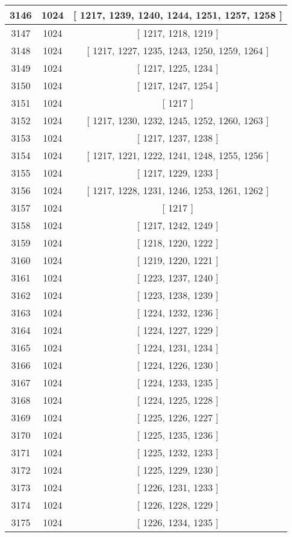 \begin{center}
\begin{longtable}[H]{|| c c c ||}
\hline
3146 & 1024 & [ 1217, 1239, 1240, 1244, 1251, 1257, 1258 ] \\ 
\hline
3147 & 1024 & [ 1217, 1218, 1219 ] \\ 
\hline
3148 & 1024 & [ 1217, 1227, 1235, 1243, 1250, 1259, 1264 ] \\ 
\hline
3149 & 1024 & [ 1217, 1225, 1234 ] \\ 
\hline
3150 & 1024 & [ 1217, 1247, 1254 ] \\ 
\hline
3151 & 1024 & [ 1217 ] \\ 
\hline
3152 & 1024 & [ 1217, 1230, 1232, 1245, 1252, 1260, 1263 ] \\ 
\hline
3153 & 1024 & [ 1217, 1237, 1238 ] \\ 
\hline
3154 & 1024 & [ 1217, 1221, 1222, 1241, 1248, 1255, 1256 ] \\ 
\hline
3155 & 1024 & [ 1217, 1229, 1233 ] \\ 
\hline
3156 & 1024 & [ 1217, 1228, 1231, 1246, 1253, 1261, 1262 ] \\ 
\hline
3157 & 1024 & [ 1217 ] \\ 
\hline
3158 & 1024 & [ 1217, 1242, 1249 ] \\ 
\hline
3159 & 1024 & [ 1218, 1220, 1222 ] \\ 
\hline
3160 & 1024 & [ 1219, 1220, 1221 ] \\ 
\hline
3161 & 1024 & [ 1223, 1237, 1240 ] \\ 
\hline
3162 & 1024 & [ 1223, 1238, 1239 ] \\ 
\hline
3163 & 1024 & [ 1224, 1232, 1236 ] \\ 
\hline
3164 & 1024 & [ 1224, 1227, 1229 ] \\ 
\hline
3165 & 1024 & [ 1224, 1231, 1234 ] \\ 
\hline
3166 & 1024 & [ 1224, 1226, 1230 ] \\ 
\hline
3167 & 1024 & [ 1224, 1233, 1235 ] \\ 
\hline
3168 & 1024 & [ 1224, 1225, 1228 ] \\ 
\hline
3169 & 1024 & [ 1225, 1226, 1227 ] \\ 
\hline
3170 & 1024 & [ 1225, 1235, 1236 ] \\ 
\hline
3171 & 1024 & [ 1225, 1232, 1233 ] \\ 
\hline
3172 & 1024 & [ 1225, 1229, 1230 ] \\ 
\hline
3173 & 1024 & [ 1226, 1231, 1233 ] \\ 
\hline
3174 & 1024 & [ 1226, 1228, 1229 ] \\ 
\hline
3175 & 1024 & [ 1226, 1234, 1235 ] \\ 

\end{longtable}
\end{center}

